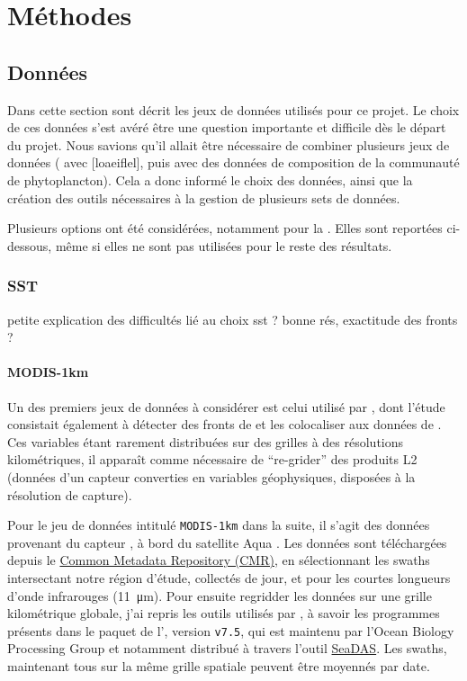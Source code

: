 \documentclass[index]{subfiles}
\begin{document}
\chapter{Méthodes}
\label{chp:methodes}

\tocsubfile

\section{Données}
\label{sec:donnees}

Dans cette section sont décrit les jeux de données utilisés pour ce projet.
Le choix de ces données s'est avéré être une question importante et difficile dès le départ du projet.
Nous savions qu'il allait être nécessaire de combiner plusieurs jeux de données ( avec [loaeiflel], puis avec des données de composition de la communauté de phytoplancton).
Cela a donc informé le choix des données, ainsi que la création des outils nécessaires à la gestion de plusieurs sets de données.

Plusieurs options ont été considérées, notamment pour la .
Elles sont reportées ci-dessous, même si elles ne sont pas utilisées pour le reste des résultats.

\subsection{SST}
\label{sec:donnees-sst}

petite explication des difficultés lié au choix sst ?
bonne rés, exactitude des fronts ?

\subsubsection{MODIS-1km}
\label{sec:donnees-sst-modis}

Un des premiers jeux de données  à considérer est celui utilisé par \textcite{liu_2016}, dont l'étude consistait également à détecter des fronts de  et les colocaliser aux données de .
Ces variables étant rarement distribuées sur des grilles à des résolutions kilométriques, il apparaît comme nécessaire de \enquote{re-grider} des produits L2 (données d'un capteur converties en variables géophysiques, disposées à la résolution de capture).

Pour le jeu de données intitulé \verb|MODIS-1km| dans la suite, il s'agit des données provenant du capteur , à bord du satellite Aqua \textcite{kilpatrick_2015}.
Les données sont téléchargées depuis le \href{cmr.earthdata.nasa.gov/search/}{Common Metadata Repository (CMR)}, en sélectionnant les swaths intersectant notre région d'étude, collectés de jour, et pour les courtes longueurs d'onde infrarouges (\qty{11}{\um}).
Pour ensuite regridder les données sur une grille kilométrique globale, j'ai repris les outils utilisés par \textcite{liu_2016}, à savoir les programmes présents dans le paquet de l'\href{oceandata.sci.gsfc.nasa.gov/ocssw}{}, version \verb|v7.5|, qui est maintenu par l'Ocean Biology Processing Group et notamment distribué à travers l'outil \href{https://seadas.gsfc.nasa.gov/}{SeaDAS}.
Les swaths, maintenant tous sur la même grille spatiale peuvent être moyennés par date.
\end{document}
